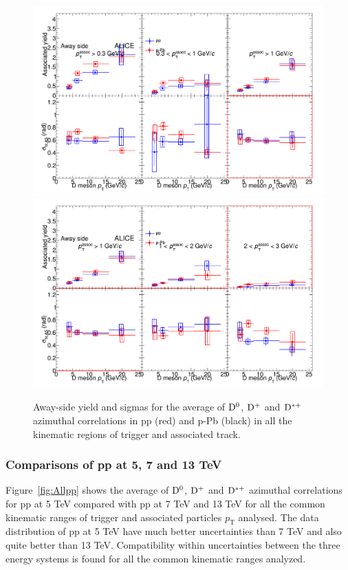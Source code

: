 \begin{figure}
\centering
\includegraphics[width=.95\linewidth]{figures/CfrPPandModels/CompareFitResults_ppVspPb_5TeV_AwaySide_1.png}
\includegraphics[width=.95\linewidth]{figures/CfrPPandModels/CompareFitResults_ppVspPb_5TeV_AwaySide_2.png}
\caption{Away-side yield and sigmas for the average of ${\rm D^0}$, ${\rm D^+}$ and ${\rm D^{*+}}$ azimuthal correlations in pp (red) and p-Pb (black) in all the kinematic regions of trigger and associated track.}
\label{fig:pp-pPb_FitAS}
\end{figure}


\subsubsection{Comparisons of pp at 5, 7 and 13 TeV}
Figure~\ref{fig:Allpp} shows the average of ${\rm D^0}$, ${\rm D^+}$ and ${\rm D^{*+}}$ azimuthal correlations for pp at 5 TeV compared with pp at 7 TeV and 13 TeV for all the common kinematic ranges of trigger and associated particles $p_\mathrm{T}$ analysed. The data distribution of pp at 5 TeV have much better uncertainties than 7 TeV and also quite better than 13 TeV. Compatibility within uncertainties between the three energy systems is found for all the common kinematic ranges analyzed. 

